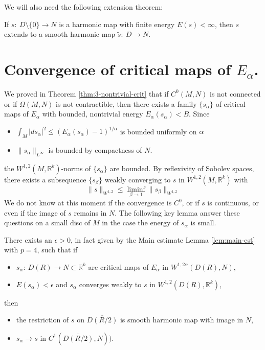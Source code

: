 We will also need the following extension theorem:

\begin{theorem}
\label{thm:extension-sacks-uhlenbeck}
If \(s:\ D\setminus \{0\} \longrightarrow N\) is a harmonic map with finite energy \(E(s) < \infty\), then \(s\) extends to a smooth harmonic map \(\tilde s:\ D \longrightarrow N\).
\end{theorem}



\section{Convergence of critical maps of \(E_{\alpha}\).}
\label{sec:org8dbc46f}

We proved in Theorem \ref{thm:3-nontrivial-crit} that if \(C^0(M,N)\) is not connected or
if \(\Omega(M,N)\) is not contractible, then there exists a family \(\{s_\alpha\}\) of
critical maps  of \(E_\alpha\) with bounded, nontrivial energy \(E_\alpha(s_\alpha) < B\). Since 
\begin{itemize}
\item \(\int_M |ds_\alpha|^2 \leq \left(E_\alpha(s_\alpha)-1\right)^{1/\alpha}\) is bounded
uniformly on \(\alpha\)
\item \(\|s_\alpha\|_{L^\infty}\) is bounded by compactness of \(N\).
\end{itemize}
the \(W^{1,2}(M, \mathbb{R}^k)\)-norms of \(\{s_\alpha\}\) are bounded. By
reflexivity of Sobolev spaces, there exists a subsequence \(\{s_\beta\}\) weakly
converging to \(s\) in \(W^{1,2}(M,\mathbb{R}^k)\) with
\[
\|s\|_{W^{1,2}}\leq \liminf_{\beta\to 1} \|s_\beta\|_{W^{1,2}}
\]
We do not know at this moment if the convergence is \(C^0\), or if \(s\) is
continuous, or even if the image of \(s\) remains in \(N\). The following key lemma
answer these questions on a small disc of \(M\) in the case the energy of \(s_\alpha\)
is small.

\begin{lemma}[Key]
\label{lem:key-sacks-uhlenbeck}
There exists an \(\epsilon>0\), in fact given by the Main estimate Lemma \ref{lem:main-est} with
\(p=4\), such that if
\begin{itemize}
\item \(s_\alpha:\ D(R) \longrightarrow N\subset \mathbb{R}^k\) are critical maps of \(E_\alpha\) in \(W^{1, 2\alpha}(D(R),N)\),
\item \(E(s_\alpha) < \epsilon\) and \(s_\alpha\) converges weakly to \(s\) in \(W^{1,2}(D(R),\mathbb{R}^k)\),
\end{itemize}
then 
\begin{itemize}
\item the restriction of \(s\) on \(\overline{D(R/2)}\) is smooth harmonic map with image in \(N\),
\item \(s_\alpha \to s\) in \(C^1(\overline{D(R/2)},N))\).
\end{itemize}
\end{lemma}

